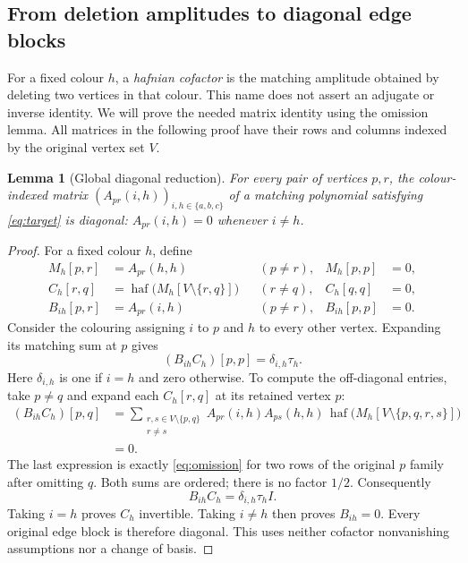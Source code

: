 \documentclass[11pt]{article}
\newtheorem{lemma}[theorem]{Lemma}
\theoremstyle{definition}
\theoremstyle{plain}
\numberwithin{equation}{section}
\begin{document}
\subsection{From deletion amplitudes to diagonal edge blocks}

For a fixed colour \(h\), a \emph{hafnian cofactor} is the matching
amplitude obtained by deleting two vertices in that colour. This name does
not assert an adjugate or inverse identity. We will prove the needed matrix
identity using the omission lemma. All matrices in the following proof have
their rows and columns indexed by the original vertex set \(V\).

\begin{lemma}[Global diagonal reduction]\label{lem:diagonal}
For every pair of vertices \(p,r\), the colour-indexed matrix
\((A_{pr}(i,h))_{i,h\in\{a,b,c\}}\) of a matching polynomial satisfying
\eqref{eq:target} is diagonal: \(A_{pr}(i,h)=0\) whenever \(i\ne h\).
\end{lemma}

\begin{proof}
For a fixed colour \(h\), define
\[
 \begin{aligned}
 M_h[p,r]&=A_{pr}(h,h) &&(p\ne r),& M_h[p,p]&=0,\\
 C_h[r,q]&=\operatorname{haf}\bigl(M_h[V\setminus\{r,q\}]\bigr)
                  &&(r\ne q),& C_h[q,q]&=0,\\
 B_{ih}[p,r]&=A_{pr}(i,h) &&(p\ne r),& B_{ih}[p,p]&=0.
 \end{aligned}
\]
Consider the colouring assigning \(i\) to \(p\) and \(h\) to every
other vertex. Expanding its matching sum at \(p\) gives
\[
 (B_{ih}C_h)[p,p]=\delta_{i,h}\tau_h.
\]
Here \(\delta_{i,h}\) is one if \(i=h\) and zero otherwise. To compute
the off-diagonal entries, take \(p\ne q\) and expand each
\(C_h[r,q]\) at its retained vertex \(p\):
\begin{equation}
 \begin{aligned}
 (B_{ih}C_h)[p,q]
 &=\sum_{\substack{r,s\in V\setminus\{p,q\}\\r\ne s}}
       A_{pr}(i,h)A_{ps}(h,h)\,
       \operatorname{haf}\bigl(M_h[V\setminus\{p,q,r,s\}]\bigr)\\
 &=0.
 \end{aligned}
 \tag{6}\label{eq:cofactor}
\end{equation}
The last expression is exactly \eqref{eq:omission} for two rows of the
original \(p\) family after omitting \(q\). Both sums are ordered; there
is no factor \(1/2\). Consequently
\[
 B_{ih}C_h=\delta_{i,h}\tau_h I.
\]
Taking \(i=h\) proves \(C_h\) invertible. Taking \(i\ne h\) then proves
\(B_{ih}=0\). Every original edge block is therefore diagonal. This uses
neither cofactor nonvanishing assumptions nor a change of basis.
\end{proof}
\end{document}
